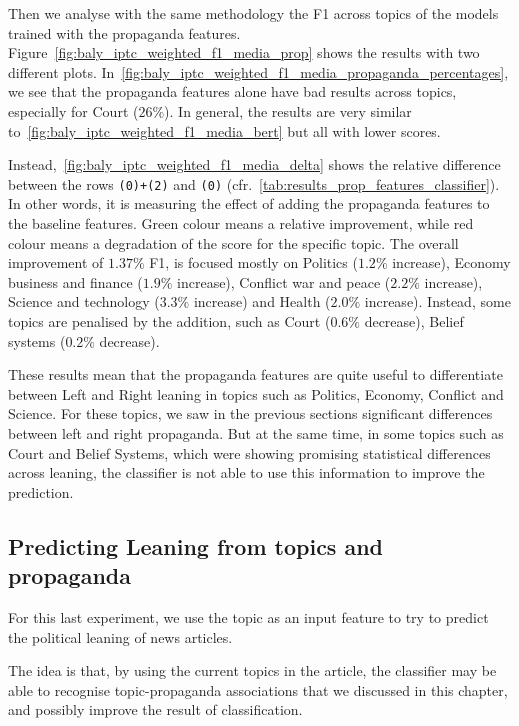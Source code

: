 Then we analyse with the same methodology the F1 across topics of the models trained with the propaganda features.
Figure~\ref{fig:baly_iptc_weighted_f1_media_prop} shows the results with two different plots. In~\ref{fig:baly_iptc_weighted_f1_media_propaganda_percentages}, we see that the propaganda features alone have bad results across topics, especially for Court ($26\%$). In general, the results are very similar to~\ref{fig:baly_iptc_weighted_f1_media_bert} but all with lower scores.

Instead,~\ref{fig:baly_iptc_weighted_f1_media_delta} shows the relative difference between the rows \texttt{(0)+(2)} and \texttt{(0)} (cfr.~\ref{tab:results_prop_features_classifier}). In other words, it is measuring the effect of adding the propaganda features to the baseline features. Green colour means a relative improvement, while red colour means a degradation of the score for the specific topic.
The overall improvement of $1.37\%$ F1, is focused mostly on Politics ($1.2\%$ increase), Economy business and finance ($1.9\%$ increase), Conflict war and peace ($2.2\%$ increase), Science and technology ($3.3\%$ increase) and Health ($2.0\%$ increase). Instead, some topics are penalised by the addition, such as Court ($0.6\%$ decrease), Belief systems ($0.2\%$ decrease).

These results mean that the propaganda features are quite useful to differentiate between Left and Right leaning in topics such as Politics, Economy, Conflict and Science. For these topics, we saw in the previous sections significant differences between left and right propaganda.
But at the same time, in some topics such as Court and Belief Systems, which were showing promising statistical differences across leaning, the classifier is not able to use this information to improve the prediction.

\subsection{\statusgreen Predicting Leaning from topics and propaganda}
\label{sec:topic_classifier_propaganda_feature}

For this last experiment, we use the topic as an input feature to try to predict the political leaning of news articles.

The idea is that, by using the current topics in the article, the classifier may be able to recognise topic-propaganda associations that we discussed in this chapter, and possibly improve the result of classification.

